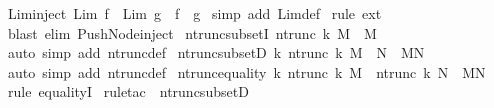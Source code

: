 \begin{isabellebody}
\isamarkupfalse%
\ Lim{\isacharunderscore}inject{\isacharcolon}\ {\isachardoublequoteopen}Lim\ f\ {\isacharequal}\ Lim\ g\ {\isacharequal}{\isacharequal}{\isachargreater}\ f\ {\isacharequal}\ g{\isachardoublequoteclose}\isanewline
%
\isadelimproof
%
\endisadelimproof
%
\isatagproof
{}\isamarkupfalse%
\ {\isacharparenleft}simp\ add{\isacharcolon}\ Lim{\isacharunderscore}def{\isacharparenright}\isanewline
{}\isamarkupfalse%
\ {\isacharparenleft}rule\ ext{\isacharparenright}\isanewline
{}\isamarkupfalse%
\ {\isacharparenleft}blast\ elim{\isacharbang}{\isacharcolon}\ Push{\isacharunderscore}Node{\isacharunderscore}inject{\isacharparenright}\isanewline
{}\isamarkupfalse%
%
\endisatagproof
{\isafoldproof}%
%
\isadelimproof
\isanewline
%
\endisadelimproof
\isanewline
\isanewline
\isanewline
\isanewline
{}\isamarkupfalse%
\ ntrunc{\isacharunderscore}subsetI{\isacharcolon}\ {\isachardoublequoteopen}ntrunc\ k\ M\ {\isacharless}{\isacharequal}\ M{\isachardoublequoteclose}\isanewline
%
\isadelimproof
%
\endisadelimproof
%
\isatagproof
{}\isamarkupfalse%
\ {\isacharparenleft}auto\ simp\ add{\isacharcolon}\ ntrunc{\isacharunderscore}def{\isacharparenright}%
\endisatagproof
{\isafoldproof}%
%
\isadelimproof
\isanewline
%
\endisadelimproof
\isanewline
{}\isamarkupfalse%
\ ntrunc{\isacharunderscore}subsetD{\isacharcolon}\ {\isachardoublequoteopen}{\isacharparenleft}{\isacharbang}{\isacharbang}k{\isachardot}\ ntrunc\ k\ M\ {\isacharless}{\isacharequal}\ N{\isacharparenright}\ {\isacharequal}{\isacharequal}{\isachargreater}\ M{\isacharless}{\isacharequal}N{\isachardoublequoteclose}\isanewline
%
\isadelimproof
%
\endisadelimproof
%
\isatagproof
{}\isamarkupfalse%
\ {\isacharparenleft}auto\ simp\ add{\isacharcolon}\ ntrunc{\isacharunderscore}def{\isacharparenright}%
\endisatagproof
{\isafoldproof}%
%
\isadelimproof
\isanewline
%
\endisadelimproof
\isanewline
\isanewline
{}\isamarkupfalse%
\ ntrunc{\isacharunderscore}equality{\isacharcolon}\ {\isachardoublequoteopen}{\isacharparenleft}{\isacharbang}{\isacharbang}k{\isachardot}\ ntrunc\ k\ M\ {\isacharequal}\ ntrunc\ k\ N{\isacharparenright}\ {\isacharequal}{\isacharequal}{\isachargreater}\ M{\isacharequal}N{\isachardoublequoteclose}\isanewline
%
\isadelimproof
%
\endisadelimproof
%
\isatagproof
{}\isamarkupfalse%
\ {\isacharparenleft}rule\ equalityI{\isacharparenright}\isanewline
{}\isamarkupfalse%
\ {\isacharparenleft}rule{\isacharunderscore}tac\ {\isacharbrackleft}{\isacharbang}{\isacharbrackright}\ ntrunc{\isacharunderscore}subsetD{\isacharparenright}\isanewline

\end{isabellebody}
